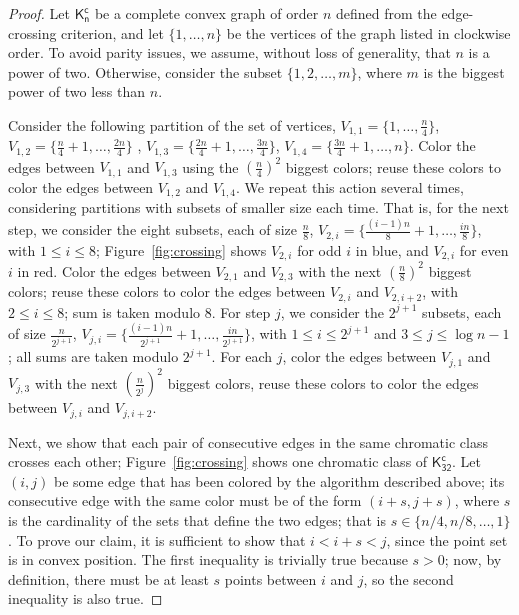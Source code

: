 \documentclass[11pt]{article}
\begin{document}
\begin{proof}
Let $\mathsf{K^{c}_{n}}$ be a complete convex graph of order $n$ defined from the edge-crossing criterion, and let $\{1, \ldots, n\}$ be the vertices of the graph listed in clockwise order. To avoid parity issues, we assume, without loss of generality, that $n$ is a power of two. Otherwise, consider the subset $\{1, 2, \ldots, m\}$, where $m$ is the biggest power of two less than $n$.

Consider the following partition of the set of vertices,
$V_{1,1} = \{1, \ldots, \frac{n}{4}\}$, 
$V_{1,2} = \{\frac{n}{4}+1, \ldots, \frac{2n}{4}\}$ ,
$V_{1,3} = \{\frac{2n}{4}+1, \ldots, \frac{3n}{4}\}$,
$V_{1,4} = \{\frac{3n}{4}+1, \ldots, n\}$. Color the edges between $V_{1,1}$ and $V_{1,3}$ using the $(\frac{n}{4})^2$ biggest colors; reuse these colors to color the edges between $V_{1,2}$ and $V_{1,4}$. We repeat this action several times, considering partitions with subsets of smaller size each time. That is, for the next step, we consider the eight subsets, each of size $\frac{n}{8}$, $V_{2,i} = \{\frac{(i-1)n}{8}+1, \ldots, \frac{in}{8}\}$, with $1 \leq i \leq 8$; Figure~\ref{fig:crossing} shows $V_{2,i}$ for odd $i$ in blue, and $V_{2,i}$ for even $i$ in red.  Color the edges between $V_{2,1}$ and $V_{2,3}$ with the next $(\frac{n}{8})^2$ biggest colors; reuse these colors to color the edges between $V_{2,i}$ and $V_{2,i+2}$, with $2 \leq i \leq 8$; sum is taken modulo $8$. For step $j$, we consider the $2^{j+1}$ subsets, each of size $\frac{n}{2^{j+1}}$, $V_{j,i} = \{\frac{(i-1)n}{2^{j+1}}+1, \ldots, \frac{in}{2^{j+1}}\}$, with $1 \leq i \leq 2^{j+1}$ and $3 \leq j \leq \log n -1$; all sums are taken modulo $2^{j+1}$. For each $j$, color the edges between $V_{j,1}$ and $V_{j,3}$ with the next 
$(\frac{n}{2^j})^2$ biggest colors, reuse these colors to color the edges between $V_{j,i}$ and $V_{j,i+2}$.

Next, we show that each pair of consecutive edges in the same chromatic class crosses each other; Figure~\ref{fig:crossing} shows one chromatic class of $\mathsf{K^{c}_{32}}$. Let $(i,j)$ be some edge that has been colored by the algorithm described above; its consecutive edge with the same color must be of the form $(i+s, j+s)$, where $s$ is the cardinality of the sets that define the two edges; that is $s \in \{n/4, n/8, \ldots, 1\}$. To prove our claim, it is sufficient to show that $i < i+s < j$, since the point set is in convex position. The first inequality is trivially true because $s > 0$; now, by definition, there must be at least $s$ points between $i$ and $j$, so the second inequality is also true. 


\end{proof}
\end{document}
